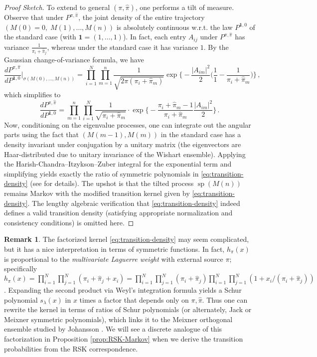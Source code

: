 \documentclass[letterpaper,11pt,oneside,reqno]{article}
\numberwithin{equation}{section}
\theoremstyle{definition}
\newtheorem{remark}[proposition]{Remark}
\begin{document}
\begin{proof}[Proof Sketch]
To extend to general $(\pi,\hat\pi)$, one performs a tilt of measure. Observe that under $P^{\pi,\hat\pi}$, the joint density of the entire trajectory $(M(0)=0,\;M(1),\dots,M(n))$ is absolutely continuous w.r.t. the law $P^{\mathbf{1},0}$ of the standard case (with $\mathbf{1}=(1,\dots,1)$). In fact, each entry $A_{ij}$ under $P^{\pi,\hat\pi}$ has variance $\frac{1}{\pi_i+\hat\pi_j}$, whereas under the standard case it has variance $1$. By the Gaussian change-of-variance formula, we have
\[
\frac{dP^{\pi,\hat\pi}}{dP^{\mathbf{1},0}}\Big|_{\sigma(M(0),\ldots,M(n))} = \prod_{i=1}^N \prod_{m=1}^n \frac{1}{\sqrt{2\pi(\pi_i+\hat\pi_m)}} \exp\!\Big\{-\frac{|A_{im}|^2}{2}\Big(\frac{1}{1} - \frac{1}{\pi_i+\hat\pi_m}\Big)\Big\}\,,
\]
which simplifies to
\[
\frac{dP^{\pi,\hat\pi}}{dP^{\mathbf{1},0}} = \prod_{m=1}^n \prod_{i=1}^N \frac{1}{\sqrt{\pi_i+\hat\pi_m}} \cdot \exp\!\Big\{-\frac{\pi_i+\hat\pi_m - 1}{\pi_i+\hat\pi_m}\frac{|A_{im}|^2}{2}\Big\}\,.
\]
Now, conditioning on the eigenvalue processes, one can integrate out the angular parts using the fact that $(M(m-1),M(m))$ in the standard case has a density invariant under conjugation by a unitary matrix (the eigenvectors are Haar-distributed due to unitary invariance of the Wishart ensemble). Applying the Harish-Chandra--Itzykson--Zuber integral for the exponential term and simplifying yields exactly the ratio of symmetric polynomials in \eqref{eq:transition-density} (see \cite[Sec.~3]{DiekerWarren2009} for details). The upshot is that the tilted process $\operatorname{sp}(M(n))$ remains Markov with the modified transition kernel given by \eqref{eq:transition-density}. The lengthy algebraic verification that \eqref{eq:transition-density} indeed defines a valid transition density (satisfying appropriate normalization and consistency conditions) is omitted here.
\end{proof}

\begin{remark}
The factorized kernel \eqref{eq:transition-density} may seem complicated, but it has a nice interpretation in terms of symmetric functions. In fact, $h_\pi(x)$ is proportional to the \emph{multivariate Laguerre weight} with external source $\pi$; specifically $h_\pi(x) = \prod_{i=1}^N \prod_{j=1}^N (\pi_i + \hat\pi_j + x_i) = \prod_{i=1}^N \prod_{j=1}^N (\pi_i + \hat\pi_j) \prod_{i=1}^N \prod_{j=1}^N (1 + x_i/(\pi_i + \hat\pi_j))$. Expanding the second product via Weyl's integration formula yields a Schur polynomial $s_\lambda(x)$ in $x$ times a factor that depends only on $\pi,\hat\pi$. Thus one can rewrite the kernel in terms of ratios of Schur polynomials (or alternately, Jack or Meixner symmetric polynomials), which links it to the Meixner orthogonal ensemble studied by Johansson \cite{Johansson2009}. We will see a discrete analogue of this factorization in Proposition \ref{prop:RSK-Markov} when we derive the transition probabilities from the RSK correspondence.
\end{remark}
\end{document}
